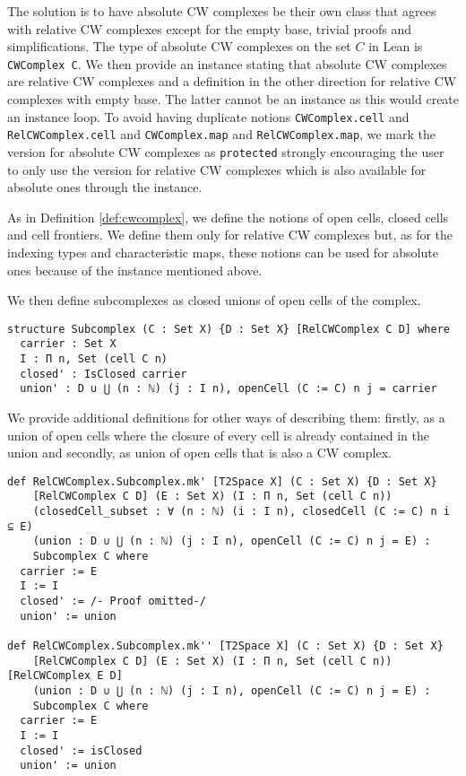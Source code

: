 The solution is to have absolute CW complexes be their own class that agrees with relative CW complexes except for the empty base, trivial proofs and simplifications. 
The type of absolute CW complexes on the set $C$ in Lean is \lstinline|CWComplex C|. 
We then provide an instance stating that absolute CW complexes are relative CW complexes and a definition in the other direction for relative CW complexes with empty base.
The latter cannot be an instance as this would create an instance loop. 
To avoid having duplicate notions \lstinline|CWComplex.cell| and \lstinline|RelCWComplex.cell| and \lstinline|CWComplex.map| and \lstinline|RelCWComplex.map|, we mark the version for absolute CW complexes as \lstinline|protected| strongly encouraging the user to only use the version for relative CW complexes which is also available for absolute ones through the instance.

As in Definition \ref{def:cwcomplex}, we define the notions of open cells, closed cells and cell frontiers.
We define them only for relative CW complexes but, as for the indexing types and characteristic maps, these notions can be used for absolute ones because of the instance mentioned above. 

We then define subcomplexes as closed unions of open cells of the complex.

\begin{lstlisting}[frame=single]
structure Subcomplex (C : Set X) {D : Set X} [RelCWComplex C D] where
  carrier : Set X
  I : Π n, Set (cell C n)
  closed' : IsClosed carrier
  union' : D ∪ ⋃ (n : ℕ) (j : I n), openCell (C := C) n j = carrier
\end{lstlisting}

We provide additional definitions for other ways of describing them: firstly, as a union of open cells where the closure of every cell is already contained in the union and secondly, as union of open cells that is also a CW complex.

\begin{lstlisting}[frame=single]
def RelCWComplex.Subcomplex.mk' [T2Space X] (C : Set X) {D : Set X} 
    [RelCWComplex C D] (E : Set X) (I : Π n, Set (cell C n))
    (closedCell_subset : ∀ (n : ℕ) (i : I n), closedCell (C := C) n i ⊆ E)
    (union : D ∪ ⋃ (n : ℕ) (j : I n), openCell (C := C) n j = E) : 
    Subcomplex C where
  carrier := E
  I := I
  closed' := /- Proof omitted-/
  union' := union

def RelCWComplex.Subcomplex.mk'' [T2Space X] (C : Set X) {D : Set X} 
    [RelCWComplex C D] (E : Set X) (I : Π n, Set (cell C n)) [RelCWComplex E D]
    (union : D ∪ ⋃ (n : ℕ) (j : I n), openCell (C := C) n j = E) : 
    Subcomplex C where
  carrier := E
  I := I
  closed' := isClosed
  union' := union
\end{lstlisting}


